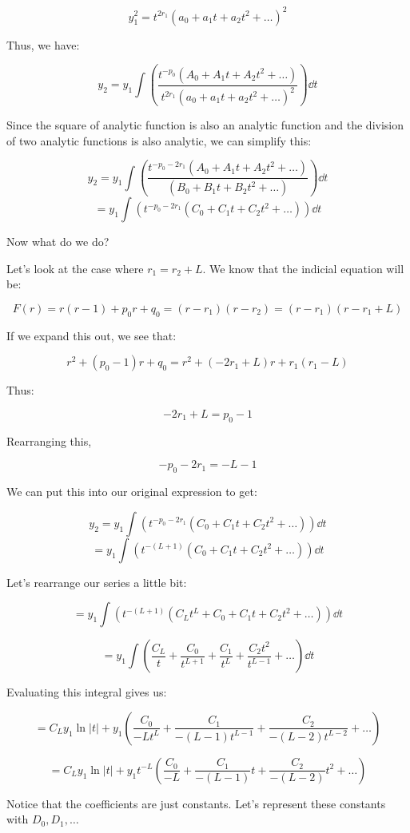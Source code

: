 \documentclass{report}
\begin{document}
{$$y_1^2 = t^{2r_1}(a_0 + a_1t + a_2t^2 + \dots)^2$$

Thus, we have:

$$y_2 = y_1\int\left( \frac{  t^{-p_0}(A_0 + A_1t + A_2t^2 + \dots)}{t^{2r_1}(a_0 + a_1t + a_2t^2 + \dots)^2} \right) \dd t$$


Since the square of analytic function is also an analytic function and the division of two analytic functions is also analytic, we can simplify this:

$$y_2 = y_1\int\left( \frac{  t^{-p_0-2r_1}(A_0 + A_1t + A_2t^2 + \dots)}{(B_0 + B_1t + B_2t^2 + \dots)} \right) \dd t $$
$$
=  y_1\int\left( t^{-p_0-2r_1}(C_0 + C_1t + C_2t^2 + \dots) \right) \dd t$$

Now what do we do?

Let's look at the case where $r_1 = r_2 + L$. We know that the indicial equation will be:

$$F(r) = r(r-1) + p_0r + q_0 = (r-r_1)(r-r_2) = (r-r_1)(r-r_1+L)$$

If we expand this out, we see that:

$$r^2 + (p_0-1)r + q_0 = r^2 + (-2r_1+L)r + r_1(r_1-L)$$

Thus:

$$-2r_1+L = p_0-1$$

Rearranging this,

$$-p_0-2r_1 = -L-1$$


We can put this into our original expression to get:

$$y_2 = y_1\int\left(   t^{-p_0-2r_1}(C_0 + C_1t + C_2t^2 + \dots) \right) \dd t $$
$$= y_1\int\left(   t^{-(L+1)}(C_0 + C_1t + C_2t^2 + \dots) \right) \dd t $$

Let's rearrange our series a little bit:

$$= y_1\int\left(  t^{-(L+1)}(C_Lt^L + C_0 + C_1t + C_2t^2 + \dots) \right) \dd t $$

$$= y_1\int\left(  \frac{C_L}{t} + \frac{C_0}{t^{L+1}} + \frac{C_1}{t^{L}} + \frac{C_2t^2}{t^{L-1}} + \dots \right) \dd t $$

Evaluating this integral gives us:

$$= C_Ly_1\ln|t| +  y_1\left( \frac{C_0}{-Lt^L} + \frac{C_1}{-(L-1)t^{L-1}} + \frac{C_2}{-(L-2)t^{L-2}} + \dots\right) $$

$$= C_Ly_1\ln|t| + y_1t^{-L}\left(\frac{C_0}{-L} + \frac{C_1}{-(L-1)}t + \frac{C_2}{-(L-2)}t^2 + \dots \right) $$

Notice that the coefficients are just constants. Let's represent these constants with $D_0, D_1, \dots$

}
\end{document}
